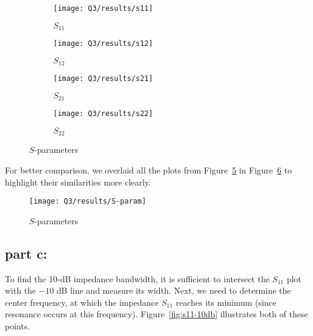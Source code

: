 \documentclass[12pt,onecolumn,a4paper]{article}
\begin{document}
	
	
	
	
	\begin{figure}[H]
		\centering
		\begin{subfigure}{.45\linewidth}
			\centering
			\texttt{[image: Q3/results/s11]}
			\caption{$S_{11}$}
			\label{fig:s11}
		\end{subfigure}
		\hfill
		\begin{subfigure}{.45\linewidth}
			\centering
			\texttt{[image: Q3/results/s12]}
			\caption{$S_{12}$}
			\label{fig:s12}
		\end{subfigure}
		
		\begin{subfigure}{.45\linewidth}
			\centering
			\texttt{[image: Q3/results/s21]}
			\caption{$S_{21}$}
			\label{fig:s21}
		\end{subfigure}
		\hfill
		\begin{subfigure}{.45\linewidth}
			\centering
			\texttt{[image: Q3/results/s22]}
			\caption{$S_{22}$}
			\label{fig:s22}
		\end{subfigure}
		\caption{$S$-parameters}
		\label{fig:S-parametes}
	\end{figure}	
	
	For better comparison, we overlaid all the plots from Figure~\ref{fig:S-parametes} in Figure~\ref{fig:S-param} to highlight their similarities more clearly.
	

	
	
	
	
	
	
	
	\begin{figure}[H]
	\centering
	\texttt{[image: Q3/results/S-param]}
	\caption{$S$-parameters}
	\label{fig:S-param}
	\end{figure}


	
	\FloatBarrier
	\subsection{part c:}
	
	To find the 10-dB impedance bandwidth, it is sufficient to intersect the $S_{11}$ plot with the $-10$ dB line and measure its width.
	Next, we need to determine the center frequency, at which the impedance $S_{11}$ reaches its minimum (since resonance occurs at this frequency). Figure~\ref{fig:s11-10db} illustrates both of these points.
	
\end{document}
